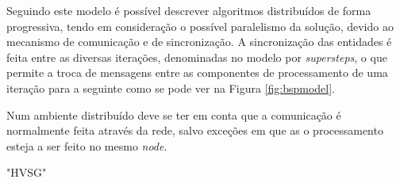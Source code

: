 Seguindo este modelo é possível descrever algoritmos distribuídos de forma 
progressiva, tendo em consideração o possível paralelismo da solução, devido ao 
mecanismo de comunicação e de sincronização. A sincronização das entidades é  
feita entre as diversas iterações, denominadas no modelo por 
\textit{supersteps}, o que permite a troca de mensagens entre as componentes de 
processamento de uma iteração para a seguinte como se pode ver na Figura 
\ref{fig:bspmodel}.

Num ambiente distribuído deve se ter em conta que a comunicação é normalmente 
feita através da rede, salvo exceções em que as o processamento esteja a ser 
feito no mesmo \textit{node}.  

{"HVSG"}